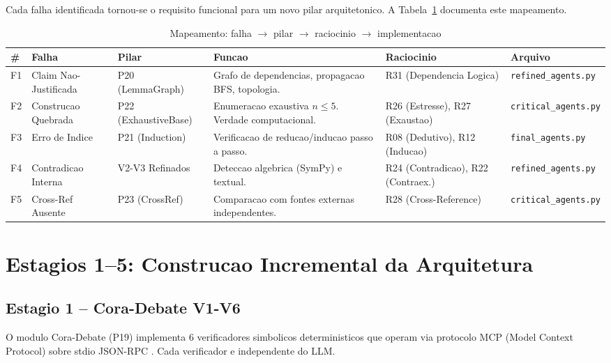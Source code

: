 \documentclass[5p]{elsarticle}
\begin{document}
Cada falha identificada tornou-se o requisito funcional para um novo pilar
arquitetonico. A Tabela~\ref{tab:map} documenta este mapeamento.


\begin{table}[H]
  \centering
  \caption{Mapeamento: falha $\to$ pilar $\to$ raciocinio $\to$ implementacao}
  \label{tab:map}
  \scriptsize
  \setlength{\tabcolsep}{3pt}
  \begin{tabular}{p{0.3cm}p{1.8cm}p{2cm}p{4cm}p{2.5cm}p{1.8cm}}
    \toprule
    \textbf{\#} & \textbf{Falha} & \textbf{Pilar} & \textbf{Funcao} & \textbf{Raciocinio} & \textbf{Arquivo}\\
    \midrule
    F1 & Claim Nao-Justificada & P20 (LemmaGraph) & Grafo de dependencias, propagacao BFS, topologia. & R31 (Dependencia Logica) & \texttt{refined\_agents.py}\\
    \rowcolor{yellowbg}
    F2 & Construcao Quebrada & P22 (ExhaustiveBase) & Enumeracao exaustiva $n\leq 5$. Verdade computacional. & R26 (Estresse), R27 (Exaustao) & \texttt{critical\_agents.py}\\
    F3 & Erro de Indice & P21 (Induction) & Verificacao de reducao/inducao passo a passo. & R08 (Dedutivo), R12 (Inducao) & \texttt{final\_agents.py}\\
    \rowcolor{yellowbg}
    F4 & Contradicao Interna & V2-V3 Refinados & Deteccao algebrica (SymPy) e textual. & R24 (Contradicao), R22 (Contraex.) & \texttt{refined\_agents.py}\\
    F5 & Cross-Ref Ausente & P23 (CrossRef) & Comparacao com fontes externas independentes. & R28 (Cross-Reference) & \texttt{critical\_agents.py}\\
    \bottomrule
  \end{tabular}
\end{table}


\section{Estagios 1--5: Construcao Incremental da Arquitetura}

\subsection{Estagio 1 -- Cora-Debate V1-V6}

O modulo Cora-Debate (P19) implementa 6 verificadores simbolicos deterministicos
que operam via protocolo MCP (Model Context Protocol) sobre stdio JSON-RPC
\cite{cora2026}. Cada verificador e independente do LLM.
\end{document}

